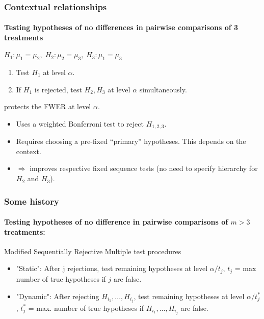 \documentclass[bigger]{beamer}
\begin{document}
\begin{frame}
\frametitle{Contextual relationships}
\framesubtitle{Testing hypotheses of no differences in pairwise
  comparisons of 3 treatments}
\begin{block}{$H_1:\mu_1=\mu_2,\; H_2:\mu_2=\mu_3,\;H_3:\mu_1=\mu_3$}
  \begin{enumerate}
  \item Test $H_1$ at level $\alpha$.
  \item If $H_1$ is rejected, test $H_2,H_3$ at level $\alpha$ simultaneously.
  \end{enumerate}
  protects the FWER at level $\alpha$.
\end{block}
\pause
  \begin{itemize}
    \item  Uses a weighted Bonferroni test to reject $H_{1,2,3}$.
    \item Requires choosing a pre-fixed ``primary'' hypotheses. This
      depends on the context.
    \item  $\Rightarrow$ improves respective fixed sequence tests (no
      need to specify hierarchy for $H_2$ and $H_3$).
  \end{itemize}

\end{frame}


\begin{frame}
\frametitle{Some history}
\framesubtitle{Testing hypotheses of no difference in pairwise
    comparisons of $m>3$ treatments:}

  Modified Sequentially Rejective
  Multiple test procedures \cite{shaffer1986modified} %
      \begin{itemize}
      \item "Static":  After j rejections, test remaining hypotheses at level $\alpha/t_j$, $t_j$ = max number of true hypotheses if $j$ are false.
      \item "Dynamic": After rejecting $H_{i_1},...,H_{i_j}$, test
        remaining hypotheses at level $\alpha/t^*_j$,  $t^*_j$ =
        max. number of true hypotheses if $H_{i_1},...,H_{i_j}$ are
        false.
      \end{itemize}


\end{frame}
\end{document}
